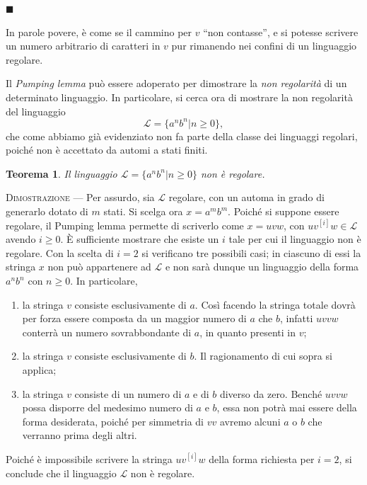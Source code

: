 \documentclass[10pt]{\classname}
\newtheorem{thm}{Teorema}
\theoremstyle{definition}
\theoremstyle{definition}
\theoremstyle{definition}
\theoremstyle{definition}
\begin{document}
\begin{flushright}
$\blacksquare$
\end{flushright}

In parole povere, è come se il cammino per $v$ ``non contasse'', e si potesse
scrivere un numero arbitrario di caratteri in $v$ pur rimanendo nei confini di
un linguaggio regolare. 

Il \emph{Pumping lemma} può essere adoperato per
dimostrare la \emph{non regolarità} di un determinato linguaggio. In
particolare, si cerca ora di mostrare la non regolarità del linguaggio \[\mathcal
L = \{a^n b^n | n \geq 0\},\] che come abbiamo già evidenziato non fa parte della classe dei linguaggi regolari, poiché non è accettato da automi a stati finiti.

\begin{thm}
    Il linguaggio $\mathcal L =\{a^n b^n | n \geq 0\}$ non è regolare.
\end{thm}

\textsc{Dimostrazione } --- Per assurdo, sia $\mathcal L$ regolare, con un automa in grado di generarlo
dotato di $m$ stati. Si scelga ora $x = a^m b^m$. Poiché si suppone essere regolare, il Pumping
lemma permette di scriverlo come $x = uvw$, con $uv^{[i]}w \in \mathcal L$
avendo $i \geq 0$. È sufficiente mostrare che esiste un $i$ tale per cui il linguaggio non è regolare. Con la scelta di $i=2$ si verificano tre possibili casi; in
ciascuno di essi la stringa $x$ non può appartenere ad $\mathcal L$ e non sarà
dunque un linguaggio della forma $a^n b^n$ con $n \geq 0$. In particolare,

\begin{enumerate}
    \item la stringa $v$ consiste esclusivamente di $a$. Così facendo la stringa totale dovrà per forza essere composta da un maggior numero di $a$ che $b$, infatti $uvvw$ conterrà un numero sovrabbondante di $a$, in quanto presenti in $v$;
    \item la stringa $v$ consiste esclusivamente di $b$. Il ragionamento di cui sopra si applica;
    \item la stringa $v$ consiste di un numero di $a$ e di $b$ diverso da zero. Benché $uvvw$ possa disporre del medesimo numero di $a$ e $b$, essa non potrà mai essere della forma desiderata, poiché per simmetria di $vv$ avremo alcuni $a$ o $b$ che verranno prima degli altri.
\end{enumerate}

Poiché è impossibile scrivere la stringa $uv^{[i]}w$ della forma richiesta per $i = 2$, si conclude che il linguaggio $\mathcal L$ non è regolare.
\end{document}
